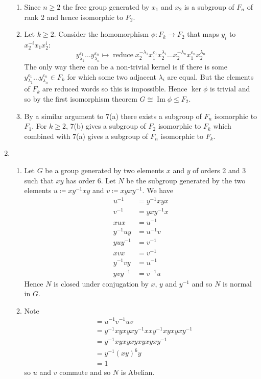 \documentclass[a4paper, 12pt]{article}
\DeclareMathOperator{\reduce}{reduce}
\DeclareMathOperator{\im}{Im}
\begin{document}
\begin{enumerate}
\begin{enumerate}
\item Since \(n\geq2\) the free group generated by \(x_1\) and \(x_2\) is a subgroup of \(F_n\) of rank 2 and hence isomorphic to \(F_2\).

\item Let \(k\geq2\). Consider the homomorphism \(\phi:F_k\to F_2\) that maps \(y_i\) to \(x_2^{-i}x_1x_2^i\):
\[y_{\lambda_1}^{\varepsilon_1}\dots y_{\lambda_n}^{\varepsilon_n} \mapsto \reduce{x_2^{-\lambda_1}x_1^{\varepsilon_1}x_2^{\lambda_1}\dots x_2^{-\lambda_n}x_1^{\varepsilon_n}x_2^{\lambda_n}}\]
The only way there can be a non-trivial kernel is if there is some \(y_{\lambda_1}^{\varepsilon_1}\dots y_{\lambda_n}^{\varepsilon_n}\in F_k\) for which some two adjacent \(\lambda_i\) are equal. But the elements of \(F_k\) are reduced words so this is impossible. Hence \(\ker\phi\) is trivial and so by the first isomorphism theorem \(G\cong\im\phi\leq F_2\).

\item By a similar argument to 7(a) there exists a subgroup of \(F_n\) isomorphic to \(F_1\). For \(k\geq2\), 7(b) gives a subgroup of \(F_2\) isomorphic to \(F_k\) which combined with 7(a) gives a subgroup of \(F_n\) isomorphic to \(F_k\).

\end{enumerate}

\item \begin{enumerate}

\item Let \(G\) be a group generated by two elements \(x\) and \(y\) of orders 2 and 3 such that \(xy\) has order 6. Let \(N\) be the subgroup generated by the two elements \(u\coloneqq xy^{-1}xy\) and \(v\coloneqq xyxy^{-1}\). We have
\begin{align*}
u^{-1}&=y^{-1}xyx\\
v^{-1}&=yxy^{-1}x\\
xux&=u^{-1}\\
y^{-1}uy&=u^{-1}v\\
yuy^{-1}&=v^{-1}\\
xvx&=v^{-1}\\
y^{-1}vy&=u^{-1}\\
yvy^{-1}&=v^{-1}u
\end{align*}
Hence \(N\) is closed under conjugation by \(x\), \(y\) and \(y^{-1}\) and so \(N\) is normal in \(G\).

\item Note
\begin{align*}
[u,v]&=u^{-1}v^{-1}uv\\
&=y^{-1}xyxyxy^{-1}xxy^{-1}xyxyxy^{-1}\\
&=y^{-1}xyxyxyxyxyxy^{-1}\\
&=y^{-1}(xy)^6y\\
&=1
\end{align*}
so \(u\) and \(v\) commute and so \(N\) is Abelian.


\end{enumerate}
\end{enumerate}
\end{document}
